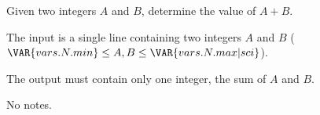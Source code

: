 Given two integers $A$ and $B$, determine the value of $A + B$.

The input is a single line containing two integers $A$ and $B$ ($\VAR{vars.N.min} \leq A, B \leq \VAR{vars.N.max | sci}$).

The output must contain only one integer, the sum of $A$ and $B$.

No notes.
